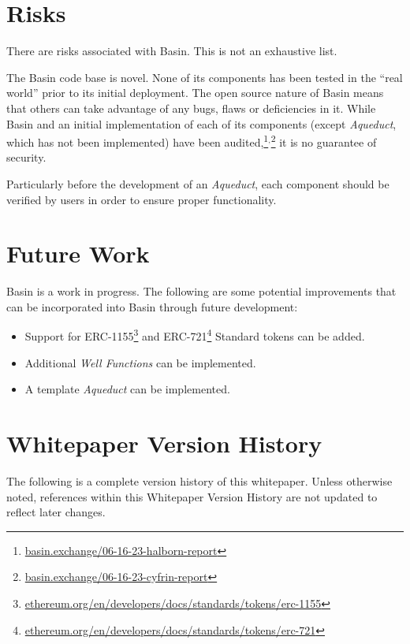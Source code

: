 \documentclass[tikz]{article}
\newcommand{\term}[1]{\textsl{#1}}
\newcommand{\fref}[1]{\footnote{\href{http://#1}{#1}}}
\begin{document}
\section{Risks}
There are risks associated with Basin. This is not an exhaustive list.

The Basin code base is novel. None of its components has been tested in the “real world” prior to its initial deployment. The open source nature of Basin means that others can take advantage of any bugs, flaws or deficiencies in it. While Basin and an initial implementation of each of its components (except \term{Aqueduct}, which has not been implemented) have been audited,\footnote{\href{https://basin.exchange/06-16-23-halborn-report}{basin.exchange/06-16-23-halborn-report}}$^{,}$\footnote{\href{https://basin.exchange/06-16-23-cyfrin-report}{basin.exchange/06-16-23-cyfrin-report}} it is no guarantee of security. 

Particularly before the development of an \term{Aqueduct}, each component should be verified by users in order to ensure proper functionality. 

\section{Future Work}
Basin is a work in progress. The following are some potential improvements that can be incorporated into Basin through future development:

\begin{itemize}
\item Support for ERC-1155\fref{ethereum.org/en/developers/docs/standards/tokens/erc-1155} and ERC-721\fref{ethereum.org/en/developers/docs/standards/tokens/erc-721} Standard tokens can be added.
\item Additional \term{Well Functions} can be implemented.
\item A template \term{Aqueduct} can be implemented.
\end{itemize}

\newpage
\section{Whitepaper Version History}

The following is a complete version history of this whitepaper. Unless otherwise noted, references within this Whitepaper Version History are not updated to reflect later changes.
\end{document}
